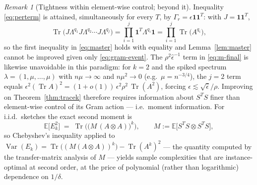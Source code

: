 \documentclass{article}
\theoremstyle{remark}
\newtheorem{remark}[theorem]{Remark}
\begin{document}
\begin{remark}[Tightness within element-wise control; beyond it]\label{rem:tight}
Inequality \eqref{eq:perterm} is attained, simultaneously for every $T$, by $\Gamma_r = \epsilon \mathbf{1}\mathbf{1}^T$: with $J = \mathbf{1}\mathbf{1}^T$,
\begin{equation}
\operatorname{Tr}\big( J \Lambda^{q_1} J \Lambda^{q_2} \cdots J \Lambda^{q_j} \big)
= \prod_{i=1}^{j} \mathbf{1}^T \Lambda^{q_i} \mathbf{1}
= \prod_{i=1}^{j} \operatorname{Tr}\!\big(A^{q_i}\big),
\end{equation}
so the first inequality in \eqref{eq:master} holds with equality and Lemma~\ref{lem:master} cannot be improved given only \eqref{eq:gram-event}. The $\rho^2 \hat\epsilon^{-1}$ term in \eqref{eq:m-final} is likewise unavoidable in this paradigm: for $k=2$ and the spiked spectrum $\lambda = (1,\mu,\dots,\mu)$ with $n\mu \to \infty$ and $n\mu^2 \to 0$ (e.g.\ $\mu = n^{-3/4}$), the $j=2$ term equals $\epsilon^2 (\operatorname{Tr} A)^2 = (1+o(1))\, \epsilon^2 \rho^2\, \operatorname{Tr}(A^2)$, forcing $\epsilon \lesssim \sqrt{\hat\epsilon}/\rho$. Improving on Theorem~\ref{thm:tracek} therefore requires information about $S^T S$ finer than element-wise control of its Gram action --- i.e.\ moment information. For i.i.d.\ sketches the exact second moment is
\begin{equation}\label{eq:second-moment}
\mathbb{E}\big[E_k^2\big] \;=\; \operatorname{Tr}\!\Big( \big( M\,(A \otimes A) \big)^{k} \Big),
\qquad
M := \mathbb{E}\big[ S^T S \otimes S^T S \big],
\end{equation}
so Chebyshev's inequality applied to $\operatorname{Var}(E_k) = \operatorname{Tr}\big((M(A\otimes A))^k\big) - \operatorname{Tr}(A^k)^2$ --- the quantity computed by the transfer-matrix analysis of $M$ --- yields sample complexities that are instance-optimal at second order, at the price of polynomial (rather than logarithmic) dependence on $1/\delta$.
\end{remark}
\end{document}
